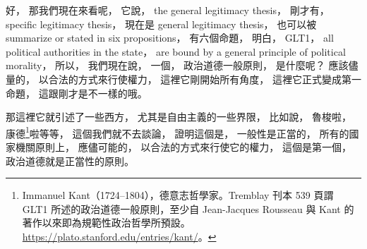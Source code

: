 \hypertarget{w02:cue:2489}{}好，
\hypertarget{w02:cue:2490}{}那我們現在來看呢，
\hypertarget{w02:cue:2491}{}它說，
\hypertarget{w02:cue:2492}{}the general legitimacy thesis，
\hypertarget{w02:cue:2493}{}剛才有，
\hypertarget{w02:cue:2494}{}specific legitimacy thesis，
\hypertarget{w02:cue:2495}{}現在是 general legitimacy thesis，
\hypertarget{w02:cue:2496}{}也可以被 summarize or stated in six propositions，
\hypertarget{w02:cue:2497}{}有六個命題，
\hypertarget{w02:cue:2498}{}明白，
\hypertarget{w02:cue:2499}{}GLT1，
\hypertarget{w02:cue:2500}{}all political authorities in the state，
\hypertarget{w02:cue:2501}{}are bound by a general principle of political morality，
\hypertarget{w02:cue:2502}{}所以，
\hypertarget{w02:cue:2503}{}我們現在說，
\hypertarget{w02:cue:2504}{}一個，
\hypertarget{w02:cue:2505}{}政治道德一般原則，
\hypertarget{w02:cue:2506}{}是什麼呢？
\hypertarget{w02:cue:2507}{}應該儘量的，
\hypertarget{w02:cue:2508}{}以合法的方式來行使權力，
\hypertarget{w02:cue:2509}{}這裡它剛開始所有角度，
\hypertarget{w02:cue:2510}{}這裡它正式變成第一命題，
\hypertarget{w02:cue:2511}{}這跟剛才是不一樣的哦。

\hypertarget{w02:cue:2512}{}那這裡它就引述了一些西方，
\hypertarget{w02:cue:2513}{}尤其是自由主義的一些界限，
\hypertarget{w02:cue:2514}{}比如說，
\hypertarget{w02:cue:2515}{}魯梭啦，
\hypertarget{w02:cue:2516}{}康德\footnote{Immanuel Kant（1724–1804），德意志哲學家。Tremblay 刊本 539 頁謂 GLT1 所述的政治道德一般原則，至少自 Jean-Jacques Rousseau 與 Kant 的著作以來即為規範性政治哲學所預設。\url{https://plato.stanford.edu/entries/kant/}。}啦等等，
\hypertarget{w02:cue:2517}{}這個我們就不去談論，
\hypertarget{w02:cue:2518}{}證明這個是，
\hypertarget{w02:cue:2519}{}一般性是正當的，
\hypertarget{w02:cue:2520}{}所有的國家機關原則上，
\hypertarget{w02:cue:2521}{}應儘可能的，
\hypertarget{w02:cue:2522}{}以合法的方式來行使它的權力，
\hypertarget{w02:cue:2523}{}這個是第一個，
\hypertarget{w02:cue:2524}{}政治道德就是正當性的原則。

